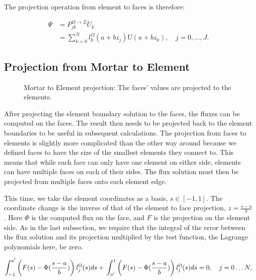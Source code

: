 The projection operation from element to faces is therefore:

\begin{align}  \label{projection_element_to_face}
	\Psi &= P_{jk}^{\Omega \rightarrow \Xi} U_k  \\
	&= \sum_{k = 0}^{N}l_k ^ \Omega(a+ b z_j) U(a + b z_k), \quad j = 0, \ldots, J.
\end{align}

\subsection{Projection from Mortar to Element}\label{subsection:adaptive_mesh_refinement:mortar_element_method:mortar_to_element}

\begin{figure}[H]
	\centering
	
	\caption{Mortar to Element projection: The faces' values are projected to the elements.}\label{fig:mortar_to_element}
\end{figure}

After projecting the element boundary solution to the faces, the fluxes can be computed on the
faces. The result then needs to be projected back to the element boundaries to be useful in
subsequent calculations. The projection from faces to elements is slightly more complicated than the
other way around because we defined faces to have the size of the smallest elements they connect to.
This means that while each face can only have one element on either side, elements can have multiple
faces on each of their sides. The flux solution must then be projected from multiple faces onto each
element edge.

This time, we take the element coordinates as a basis, \(s \in [-1, 1]\). The coordinate change is
the inverse of that of the element to face projection, \(z = \frac{s - a}{b}\). Here \(\Phi \) is
the computed flux on the face, and \(F\) is the projection on the element side. As in the last
subsection, we require that the integral of the error between the flux solution and its projection
multiplied by the test function, the Lagrange polynomials here, be zero.

\begin{equation} \label{equ:zero_error_to_element}
	\int_{-1}^{o'} \left( F(s) - \Phi (\frac{s - a}{b}) \right) l_j^\Omega(s)ds + \\
	\int_{o'}^{1} \left( F(s) - \Phi (\frac{s - a}{b}) \right) l_j^\Omega (s)ds = 0, \\
	\quad j = 0 \ldots N,
\end{equation}

